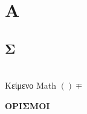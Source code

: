 \documentclass[twoside,10pt]{book}
\newcommand{\orismoi}{\begin{center}
{\large \textbf{ΟΡΙΣΜΟΙ}}
\end{center}}
\begin{document}
	\chapter{Α}
	\section{Σ}\mbox{}\\
	Κείμενο {} Math  $ ()\mp $
\\\orismoi
\end{document}
